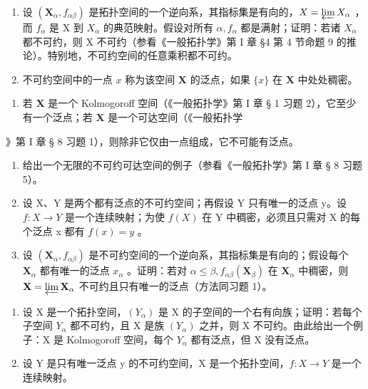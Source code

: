 
\begin{enumerate}
\def\labelenumi{\arabic{enumi}.}
\item
  设 \((\mathbf{X}_{\alpha}, f_{\alpha\beta})\) 是拓扑空间的一个逆向系，其指标集是有向的，\(X = \varprojlim X_{\alpha}\) ，而 \(f_{\alpha}\) 是 X 到 \(X_{\alpha}\) 的典范映射。假设对所有 \(\alpha, f_{\alpha}\) 都是满射；证明：若诸 \(X_{\alpha}\) 都不可约，则 X 不可约（参看《一般拓扑学》第 I 章 §4 第 4 节命题 9 的推论）。特别地，不可约空间的任意乘积都不可约。
\item
  不可约空间中的一点 \(x\) 称为该空间 \(\mathbf{X}\) 的泛点，如果 \(\{x\}\) 在 \(\mathbf{X}\) 中处处稠密。
\end{enumerate}

\begin{enumerate}
\def\labelenumi{(\alph{enumi})}
\tightlist
\item
  若 \(\mathbf{X}\) 是一个 Kolmogoroff 空间（《一般拓扑学》第 I 章 § 1 习题 2），它至少有一个泛点；若 \(\mathbf{X}\) 是一个可达空间（《一般拓扑学
\end{enumerate}

》第 I 章 § 8 习题 1），则除非它仅由一点组成，它不可能有泛点。

\begin{enumerate}
\def\labelenumi{(\alph{enumi})}
\setcounter{enumi}{1}
\item
  给出一个无限的不可约可达空间的例子（参看《一般拓扑学》第 I 章 § 8 习题 5）。
\item
  设 X、Y 是两个都有泛点的不可约空间；再假设 Y 只有唯一的泛点 y。设 \(f: X \to Y\) 是一个连续映射；为使 \(f(X)\) 在 Y 中稠密，必须且只需对 X 的每个泛点 x 都有 \(f(x) = y\) 。
\item
  设 \((\mathbf{X}_{\alpha}, f_{\alpha \beta})\) 是不可约空间的一个逆向系，其指标集是有向的；假设每个 \(\mathbf{X}_{\alpha}\) 都有唯一的泛点 \(x_{\alpha}\) 。证明：若对 \(\alpha \leqslant \beta, f_{\alpha \beta}(\mathbf{X}_{\beta})\) 在 \(\mathbf{X}_{\alpha}\) 中稠密，则 \(\mathbf{X} = \varprojlim \mathbf{X}_{\alpha}\) 不可约且只有唯一的泛点（方法同习题 1）。
\end{enumerate}

\begin{enumerate}
\def\labelenumi{\arabic{enumi}.}
\setcounter{enumi}{2}
\item
  设 X 是一个拓扑空间，\((Y_{\alpha})\) 是 X 的子空间的一个右有向族；证明：若每个子空间 \(Y_{\alpha}\) 都不可约，且 X 是族 \((Y_{\alpha})\) 之并，则 X 不可约。由此给出一个例子：X 是 Kolmogoroff 空间，每个 \(Y_{\alpha}\) 都有泛点，但 X 没有泛点。
\item
  设 Y 是只有唯一泛点 y 的不可约空间，X 是一个拓扑空间，\(f: X \rightarrow Y\) 是一个连续映射。
\end{enumerate}

